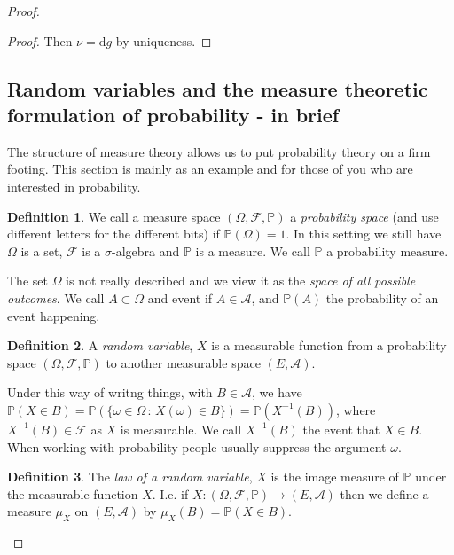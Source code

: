 \documentclass[
]{book}
\theoremstyle{definition}
\newtheorem{definition}{Definition}[chapter]
\theoremstyle{definition}
\theoremstyle{definition}
\theoremstyle{definition}
\theoremstyle{remark}
\begin{document}
\begin{proof}
\begin{proof}
Then \(\nu = \mathrm{d}g\) by uniqueness.
\end{proof}

\hypertarget{random-variables-and-the-measure-theoretic-formulation-of-probability---in-brief}{%
\subsection{Random variables and the measure theoretic formulation of probability - in brief}\label{random-variables-and-the-measure-theoretic-formulation-of-probability---in-brief}}

The structure of measure theory allows us to put probability theory on a firm footing. This section is mainly as an example and for those of you who are interested in probability.

\begin{definition}
We call a measure space \((\Omega, \mathcal{F}, \mathbb{P})\) a \emph{probability space} (and use different letters for the different bits) if \(\mathbb{P}(\Omega) = 1\). In this setting we still have \(\Omega\) is a set, \(\mathcal{F}\) is a \(\sigma\)-algebra and \(\mathbb{P}\) is a measure. We call \(\mathbb{P}\) a probability measure.
\end{definition}

The set \(\Omega\) is not really described and we view it as the \emph{space of all possible outcomes}. We call \(A \subset \Omega\) and event if \(A \in \mathcal{A}\), and \(\mathbb{P}(A)\) the probability of an event happening.

\begin{definition}
A \emph{random variable}, \(X\) is a measurable function from a probability space \((\Omega, \mathcal{F}, \mathbb{P})\) to another measurable space \((E, \mathcal{A})\).
\end{definition}

Under this way of writng things, with \(B \in \mathcal{A}\), we have \(\mathbb{P}(X \in B) = \mathbb{P}(\{ \omega \in \Omega \,:\, X(\omega) \in B\}) = \mathbb{P}( X^{-1}(B))\), where \(X^{-1}(B) \in \mathcal{F}\) as \(X\) is measurable. We call \(X^{-1}(B)\) the event that \(X \in B\). When working with probability people usually suppress the argument \(\omega\).

\begin{definition}
The \emph{law of a random variable}, \(X\) is the image measure of \(\mathbb{P}\) under the measurable function \(X\). I.e. if \(X: (\Omega, \mathcal{F}, \mathbb{P}) \rightarrow (E, \mathcal{A})\) then we define a measure \(\mu_X\) on \((E, \mathcal{A})\) by \(\mu_X(B) = \mathbb{P}(X \in B)\).
\end{definition}


\end{proof}
\end{document}
